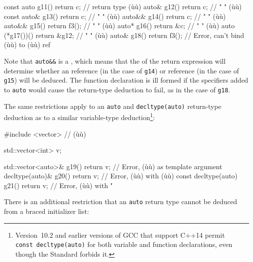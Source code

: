 \begin{emcppslisting}
const auto  g11() { return c; }     // return type (ù{}ù)
auto&       g12() { return c; }     //    "     "  (ù{}ù)
const auto& g13() { return c; }     //    "     "  (ù{}ù)
auto&&      g14() { return c; }     //    "     "  (ù{}ù)
auto&&      g15() { return f3(); }  //    "     "  (ù{}ù)
auto*       g16() { return &c; }    //    "     "  (ù{}ù)
auto   (*g17())() { return &g12; }  //    "     "  (ù{}ù)
auto&       g18() { return f3(); }  // Error, can't bind (ù{}ù) to (ù{}ù) ref
\end{emcppslisting}
    

\noindent Note that \lstinline!auto&&! is a , which
means that the  of the return expression will
determine whether an  reference (in the case of
\lstinline!g14!) or  reference (in the case of \lstinline!g15!)
will be deduced. The function declaration is ill formed if the
specifiers added to \lstinline!auto! would cause the return-type deduction
to fail, as in the case of \lstinline!g18!.

The same restrictions apply to an \lstinline!auto! and
\lstinline!decltype(auto)! return-type deduction as to a similar
variable-type deduction{\cprotect\footnote{Version~10.2 and earlier
versions of GCC that support C++14 permit
\lstinline!const!~\lstinline!decltype(auto)! for both variable and function
  declarations, even though the Standard forbids it.}}:

\begin{emcppslisting}
#include <vector>  // (ù{}ù)

std::vector<int> v;

std::vector<auto>&   g19() { return v; }  // Error, (ù{}ù) as template argument
decltype(auto)&      g20() { return v; }  // Error, (ù{\codeincomments{\&}}ù) with (ù{}ù)
const decltype(auto) g21() { return v; }  // Error, (ù{}ù) with   "
\end{emcppslisting}
    

\noindent There is an additional restriction that an \lstinline!auto! return type
cannot be deduced from a braced initializer list:

